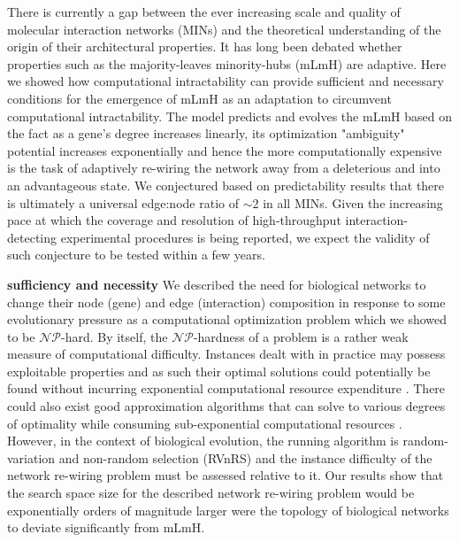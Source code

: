 \documentclass[12pt]{article}
\newcommand{\myC}[1]{{$\mathcal{#1}$}}
\begin{document}
There is currently  a gap between the ever increasing scale and quality of molecular interaction networks (MINs) and the theoretical understanding of the origin of their architectural properties. It has long been debated whether properties such as the majority-leaves minority-hubs (mLmH) are adaptive. Here we showed how computational intractability can provide sufficient and necessary conditions for the emergence of mLmH as an adaptation to circumvent computational intractability. The model predicts and evolves the mLmH based on the fact as a gene's degree increases linearly, its optimization "ambiguity" potential increases exponentially and hence the more computationally expensive is the task of adaptively re-wiring the network away from a deleterious and into an advantageous state. We conjectured based on predictability results that there is ultimately  a universal edge:node ratio of ${\sim}$2 in all MINs. Given the increasing pace at which the coverage \cite{gerstein_architecture_2012,rolland_proteome-scale_2014} and resolution \cite{han_trrust:_2015,yang_widespread_2016} of high-throughput interaction-detecting experimental procedures is being reported, we expect the validity of such conjecture to be tested within a few years.

\textbf{sufficiency and necessity} We described the need for biological networks to change their node (gene) and edge (interaction) composition in response to some evolutionary pressure as a computational optimization problem which we showed to be \myC{NP}-hard. By itself, the \myC{NP}-hardness of a problem is a rather weak measure of  computational difficulty.  Instances dealt with in practice may possess exploitable properties and as such their  optimal solutions could potentially be found without incurring exponential computational resource expenditure \cite{vazirani_approximation_2013}. There could also exist good approximation algorithms that can solve to various degrees of optimality while consuming sub-exponential computational resources \cite{lawler_fast_1979}. However, in the context of biological evolution, the running algorithm is random-variation and non-random selection (RVnRS) and the instance difficulty of the network re-wiring problem must be assessed relative to it. Our results show that the search space size for the described network re-wiring problem would be exponentially orders of magnitude larger were the topology of biological networks to deviate significantly from mLmH.
\end{document}
